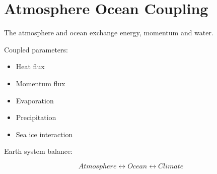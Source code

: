 \section{Atmosphere Ocean Coupling}


The atmosphere and ocean exchange energy, momentum and water.



Coupled parameters:


\begin{itemize}

\item Heat flux

\item Momentum flux

\item Evaporation

\item Precipitation

\item Sea ice interaction

\end{itemize}



Earth system balance:


\[
Atmosphere
\leftrightarrow
Ocean
\leftrightarrow
Climate
\]

